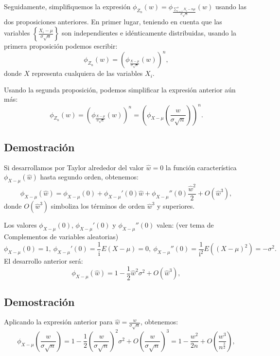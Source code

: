 \documentclass[]{book}
\begin{document}
Seguidamente, simplifiquemos la expresión \(\phi_{Z_n}(w)=\phi_{\frac{\sum\limits_{i=1}^n X_i-n\mu}{\sigma\sqrt{n}}}(w)\) usando las dos proposiciones anteriores. En primer lugar, teniendo en cuenta que las variables \(\left\{\frac{X_i-\mu}{\sigma\sqrt{n}}\right\}\) son independientes e idénticamente distribuidas, usando la primera proposición podemos escribir:
\[
\phi_{Z_n}(w) = \left(\phi_{\frac{X-\mu}{\sigma\sqrt{n}}}(w)\right)^n,
\]
donde \(X\) representa cualquiera de las variables \(X_i\).

Usando la segunda proposición, podemos simplificar la expresión anterior aún más:
\[
\phi_{Z_n}(w) = \left(\phi_{\frac{X-\mu}{\sigma\sqrt{n}}}(w)\right)^n = \left(\phi_{X-\mu}\left(\frac{w}{\sigma\sqrt{n}}\right)\right)^n.
\]

\hypertarget{demostraciuxf3n-8}{%
\subsection{Demostración}\label{demostraciuxf3n-8}}

Si desarrollamos por Taylor alrededor del valor \(\hat{w}=0\) la función característica \(\phi_{X-\mu}\left(\hat{w}\right)\) hasta segundo orden, obtenemos:
\[
\phi_{X-\mu}\left(\hat{w}\right) = \phi_{X-\mu}\left(0\right)+ \phi_{X-\mu}'\left(0\right) \hat{w}+ \phi_{X-\mu}''\left(0\right)\frac{\hat{w}^2}{2}+O(\hat{w}^3),
\]
donde \(O(\hat{w}^3)\) simboliza los términos de orden \(\hat{w}^3\) y superiores.

Los valores \(\phi_{X-\mu}\left(0\right)\), \(\phi_{X-\mu}'\left(0\right)\) y \(\phi_{X-\mu}''\left(0\right)\) valen: (ver tema de Complementos de variables aleatorias)
\[
\phi_{X-\mu}\left(0\right)=1, \ \phi_{X-\mu}'\left(0\right)=\frac{1}{\mathrm{i}}E(X-\mu)=0,\ \phi_{X-\mu}''\left(0\right)=\frac{1}{\mathrm{i}^2}E\left((X-\mu)^2\right)=-\sigma^2.
\]
El desarrollo anterior será:
\[
\phi_{X-\mu}\left(\hat{w}\right) =1 - \frac{1}{2}\hat{w}^2\sigma^2+O(\hat{w}^3),
\]

\hypertarget{demostraciuxf3n-9}{%
\subsection{Demostración}\label{demostraciuxf3n-9}}

Aplicando la expresión anterior para \(\hat{w}=\frac{w}{\sigma\sqrt{n}}\), obtenemos:
\[
\phi_{X-\mu}\left(\frac{w}{\sigma\sqrt{n}}\right) =1 - \frac{1}{2}\left(\frac{w}{\sigma\sqrt{n}}\right)^2\sigma^2+O\left(\frac{w}{\sigma\sqrt{n}}\right)^3= 1-\frac{w^2}{2n}+O\left(\frac{w^3}{n^{\frac{3}{2}}}\right),
\]
\end{document}
